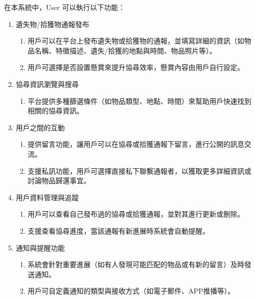 \documentclass[12pt,a4paper]{article}
\begin{document}
在本系統中，User 可以執行以下功能：
\begin{enumerate}
\item 

遺失物/拾獲物通報發布
\begin{enumerate}
    \item 用戶可以在平台上發布遺失物或拾獲物的通報，並填寫詳細的資訊（如物品名稱、特徵描述、遺失/拾獲的地點與時間、物品照片等）。
    \item 用戶可選擇是否設置懸賞來提升協尋效率，懸賞內容由用戶自行設定。
\end{enumerate}

\item 

協尋資訊瀏覽與搜尋
\begin{enumerate}
    \item 平台提供多種篩選條件（如物品類型、地點、時間）來幫助用戶快速找到相關的協尋資訊。
\end{enumerate}

\item 

用戶之間的互動
\begin{enumerate}
    \item 提供留言功能，讓用戶可以在協尋或拾獲通報下留言，進行公開的訊息交流。
    \item 支援私訊功能，用戶可選擇直接私下聯繫通報者，以獲取更多詳細資訊或討論物品歸還事宜。
\end{enumerate}

\item 

用戶資料管理與追蹤
\begin{enumerate}
    \item 用戶可以查看自己發布過的協尋或拾獲通報，並對其進行更新或刪除。
    \item 支援查看協尋進度，當該通報有新進展時系統會自動提醒。
\end{enumerate}

\item 

通知與提醒功能
\begin{enumerate}
    \item 系統會針對重要進展（如有人發現可能匹配的物品或有新的留言）及時發送通知。
    \item 用戶可自定義通知的類型與接收方式（如電子郵件、APP推播等）。
\end{enumerate}


\end{enumerate}
\end{document}
